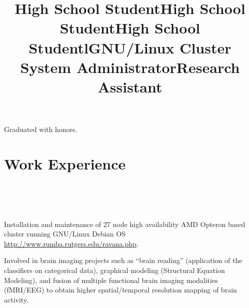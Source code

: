 \documentclass[10pt,overlapped,line]{res}
\begin{document}
\begin{resume}
 \title{High School Student}
 \begin{position}
  Graduated with honors.
 \end{position}

 \title{High School Student}
 \begin{position}
 \end{position}

 \title{High School Student}
 \begin{position}
 \end{position}

 \section{Work Experience}
 \begin{format}
   \title{l}\\
   \\
   \body\\
 \end{format}

 \title{GNU/Linux Cluster System Administrator}
 \begin{position}
   Installation and maintenance of 27 node high availability {AMD}
   {O}pteron based cluster running GNU/Linux Debian OS\\
   \href{URL}{http://www.rumba.rutgers.edu/ravana.php}.
 \end{position}

 \title{Research Assistant}
 \begin{position}
   Involved in brain imaging projects such as ``brain reading''
   (application of the classifiers on categorical data), graphical
   modeling (Structural Equation Modeling), and fusion of multiple
   functional brain imaging modalities (f{MRI}/{EEG}) to obtain higher
   spatial/temporal resolution mapping of brain activity.
 \end{position}


\end{resume}
\end{document}
